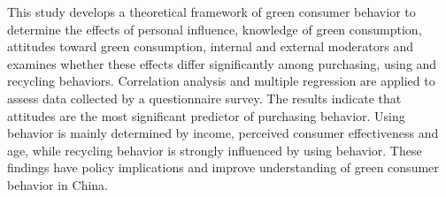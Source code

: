 This study develops a theoretical framework of green consumer behavior to determine the effects of personal influence, knowledge of green consumption, attitudes toward green consumption, internal and external moderators and examines whether these effects differ significantly among purchasing, using and recycling behaviors. Correlation analysis and multiple regression are applied to assess data collected by a questionnaire survey. The results indicate that attitudes are the most significant predictor of purchasing behavior. Using behavior is mainly determined by income, perceived consumer effectiveness and age, while recycling behavior is strongly influenced by using behavior. These findings have policy implications and improve understanding of green consumer behavior in China.